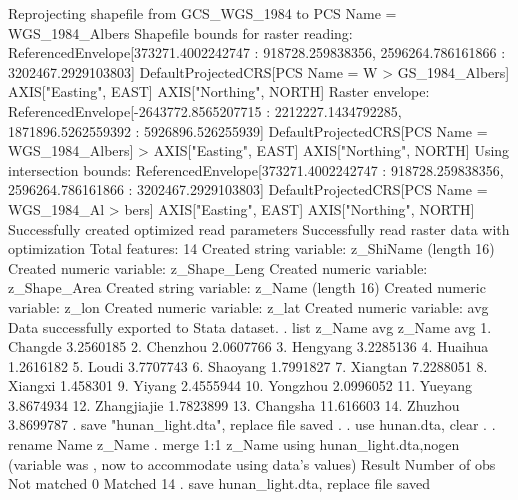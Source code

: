 Reprojecting shapefile from GCS_WGS_1984 to PCS Name = WGS_1984_Albers
Shapefile bounds for raster reading: ReferencedEnvelope[373271.4002242747 : 918728.259838356, 2596264.786161866 : 3202467.2929103803] DefaultProjectedCRS[PCS Name = W
> GS_1984_Albers] AXIS["Easting", EAST] AXIS["Northing", NORTH]
Raster envelope: ReferencedEnvelope[-2643772.8565207715 : 2212227.1434792285, 1871896.5262559392 : 5926896.526255939] DefaultProjectedCRS[PCS Name = WGS_1984_Albers] 
> AXIS["Easting", EAST] AXIS["Northing", NORTH]
Using intersection bounds: ReferencedEnvelope[373271.4002242747 : 918728.259838356, 2596264.786161866 : 3202467.2929103803] DefaultProjectedCRS[PCS Name = WGS_1984_Al
> bers] AXIS["Easting", EAST] AXIS["Northing", NORTH]
Successfully created optimized read parameters
Successfully read raster data with optimization
Total features: 14
Created string variable: z_ShiName (length 16)
Created numeric variable: z_Shape_Leng
Created numeric variable: z_Shape_Area
Created string variable: z_Name (length 16)
Created numeric variable: z_lon
Created numeric variable: z_lat
Created numeric variable: avg
Data successfully exported to Stata dataset.
{\smallskip}
. list z_Name avg
{\smallskip}
     {\TLC}
     {\VBAR}      z_Name         avg {\VBAR}
     {\LFTT}
  1. {\VBAR}     Changde   3.2560185 {\VBAR}
  2. {\VBAR}    Chenzhou   2.0607766 {\VBAR}
  3. {\VBAR}    Hengyang   3.2285136 {\VBAR}
  4. {\VBAR}     Huaihua   1.2616182 {\VBAR}
  5. {\VBAR}       Loudi   3.7707743 {\VBAR}
     {\LFTT}
  6. {\VBAR}    Shaoyang   1.7991827 {\VBAR}
  7. {\VBAR}    Xiangtan   7.2288051 {\VBAR}
  8. {\VBAR}     Xiangxi    1.458301 {\VBAR}
  9. {\VBAR}      Yiyang   2.4555944 {\VBAR}
 10. {\VBAR}    Yongzhou   2.0996052 {\VBAR}
     {\LFTT}
 11. {\VBAR}     Yueyang   3.8674934 {\VBAR}
 12. {\VBAR} Zhangjiajie   1.7823899 {\VBAR}
 13. {\VBAR}    Changsha   11.616603 {\VBAR}
 14. {\VBAR}     Zhuzhou   3.8699787 {\VBAR}
     {\BLC}
{\smallskip}
. save "hunan_light.dta", replace
file{} saved
{\smallskip}
. 
. use hunan.dta, clear
{\smallskip}
. 
. rename Name z_Name  
{\smallskip}
. merge 1:1 z_Name using hunan_light.dta,nogen
(variable {} was {}, now {} to accommodate using data's values)
{\smallskip}
    Result                      Number of obs
    Not matched                             0
    Matched                                14  
{\smallskip}
. save hunan_light.dta, replace
file{} saved
{\smallskip}
